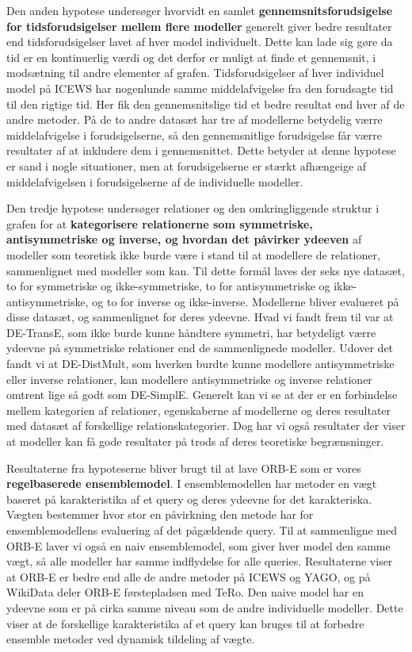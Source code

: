 \begin{multicols*}{2}
Den anden hypotese undersøger hvorvidt en samlet \textbf{gennemsnitsforudsigelse for tidsforudsigelser mellem flere modeller} generelt giver bedre resultater end tidsforudsigelser lavet af hver model individuelt. Dette kan lade sig gøre da tid er en kontinuerlig værdi og det derfor er muligt at finde et gennemsnit, i modsætning til andre elementer af grafen. Tidsforudsigelser af hver individuel model på ICEWS har nogenlunde samme middelafvigelse fra den forudsagte tid til den rigtige tid. Her fik den gennemsnitslige tid et bedre resultat end hver af de andre metoder. På de to andre datasæt har tre af modellerne betydelig værre middelafvigelse i forudsigelserne, så den gennemsnitlige forudsigelse får værre resultater af at inkludere dem i gennemsnittet. Dette betyder at denne hypotese er sand i nogle situationer, men at forudsigelserne er stærkt afhængeige af middelafvigelsen i forudsigelserne af de individuelle modeller. 

Den tredje hypotese undersøger relationer og den omkringliggende struktur i grafen for at \textbf{kategorisere relationerne som symmetriske, antisymmetriske og inverse, og hvordan det påvirker ydeeven} af modeller som teoretisk ikke burde være i stand til at modellere de relationer, sammenlignet med modeller som kan.
Til dette formål laves der seks nye datasæt, to for symmetriske og ikke-symmetriske, to for antisymmetriske og ikke-antisymmetriske, og to for inverse og ikke-inverse. Modellerne bliver evalueret på disse datasæt, og sammenlignet for deres ydeevne.
Hvad vi fandt frem til var at DE-TransE, som ikke burde kunne håndtere symmetri, har betydeligt værre ydeevne på symmetriske relationer end de sammenlignede modeller. Udover det fandt vi at DE-DistMult, som hverken burdte kunne modellere antisymmetriske eller inverse relationer, kan modellere antisymmetriske og inverse relationer omtrent lige så godt som DE-SimplE.
Generelt kan vi se at der er en forbindelse mellem kategorien af relationer, egenskaberne af modellerne og deres resultater med datasæt af forskellige relationskategorier. Dog har vi også resultater der viser at modeller kan få gode resultater på trods af deres teoretiske begrænsninger. 

Resultaterne fra hypoteserne bliver brugt til at lave ORB-E som er vores \textbf{regelbaserede ensemblemodel}. I ensemblemodellen har metoder en vægt baseret på karakteristika af et query og deres ydeevne for det karakteriska. Vægten bestemmer hvor stor en påvirkning den metode har for ensemblemodellens evaluering af det pågældende query. Til at sammenligne med ORB-E laver vi også en naiv ensemblemodel, som giver hver model den samme vægt, så alle modeller har samme indflydelse for alle queries. Resultaterne viser at ORB-E er bedre end alle de andre metoder på ICEWS og YAGO, og på WikiData deler ORB-E førstepladsen med TeRo. Den naive model har en ydeevne som er på cirka samme niveau som de andre individuelle modeller. Dette viser at de forskellige karakteristika af et query kan bruges til at forbedre ensemble metoder ved dynamisk tildeling af vægte. 


\end{multicols*}
